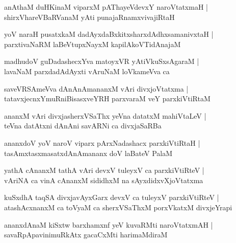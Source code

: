 \begin{shloka}
anAthaM duHKinaM viparxM pAThayeVdevxY naroVtatxmaH |\\
shirxVhareVBaRVanaM yAti punajaRnamxvivajiRtaH
\end{shloka}

\begin{shloka}
yoV naraH pusatxkaM dadAyxdaBxkitxsharxdAdhxsamanivxtaH |\\
parxtivaNaRM laBeVtupxNayxM kapilAkoVTidAnajaM 
\end{shloka}

\begin{shloka}
madhudoV guDadashecxYva matoyxVR yAtiVkuSxsAgaraM |\\
lavaNaM parxdadAdAyxti vAruNaM loVkameVva ca 
\end{shloka}

\begin{shloka}
saveVRSAmeVva dAnAnAmananxM vAri divxjoVtatxma |\\
tatavxjecnxYmuRniBisasxveYRH parxvaraM veY parxkiVtiRtaM 
\end{shloka}

\begin{shloka}
ananxM vAri divxjasherxVSaThx yeVna datatxM mahiVtaLeV |\\
teVna datAtxni dAnAni savARNi ca divxjaSaRBa
\end{shloka}

\begin{shloka}
ananxdoV yoV naroV viparx pArxNadashacx parxkiVtiRtaH |\\
tasAmxtasxmasatxdAnAmananx doV laBateV PalaM
\end{shloka}

\begin{shloka}
yathA cAnanxM tathA vAri devxV tuleyxV ca parxkiVtiRteV |\\
vAriNA ca vinA cAnanxM sididhxM na sAyxdidxvXjoVtatxma
\end{shloka}

\begin{shloka}
kuSxdhA taqSA divxjavAyxGarx devxV ca tuleyxV parxkiVtiRteV |\\
atashAcxnanxM ca toVyaM ca sherxVSaThxM porxVkatxM divxjeYrapi
\end{shloka}

\begin{shloka}
ananxdAnaM kiSxtw barxhamxnf yeV kuvaRMti naroVtatxmAH |\\
savaRpApavinimuRkAtx gacaCxMti harimaMdiraM
\end{shloka}

